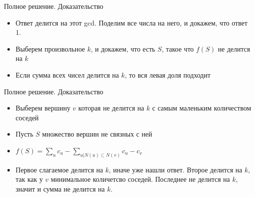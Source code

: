 \begin{frame}{Полное решение. Доказательство}
  \begin{itemize}
  \item Ответ делится на этот gcd. Поделим все числа на него, и докажем, что ответ 1.
  \item Выберем произвольное $k$, и докажем, что есть $S$, такое что $f(S)$ не делится на $k$
  \item Если сумма всех чисел делится на $k$, то вся левая доля подходит
  \end{itemize}
\end{frame}

\begin{frame}{Полное решение. Доказательство}
  \begin{itemize}
  \item Выберем вершину $v$ которая не делится на $k$ с самым маленьким количеством соседей
  \item Пусть $S$ множество вершин не связных с ней
  \item $f(S) = \sum\limits_{u}{c_u} - \sum\limits_{u | N(u) \subset N(v)}{c_u} - c_v$
  \item Первое слагаемое делится на $k$, иначе уже нашли ответ. Второе делится на $k$, так как у $v$ минимальное количетсво соседей. 
        Последнее не делится на $k$, значит и сумма не делится на $k$.
  \end{itemize}
\end{frame}
